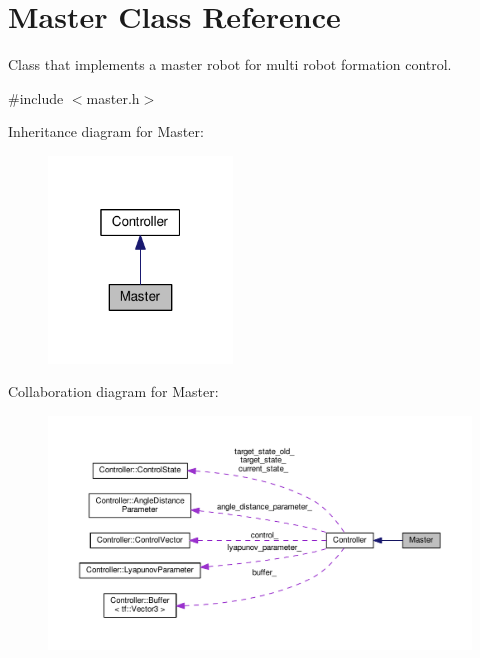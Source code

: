 \hypertarget{classMaster}{}\section{Master Class Reference}
\label{classMaster}


Class that implements a master robot for multi robot formation control.  




{\ttfamily \#include $<$master.\+h$>$}



Inheritance diagram for Master\+:\nopagebreak
\begin{figure}[H]
\begin{center}
\leavevmode
\includegraphics[width=139pt]{db/de8/classMaster__inherit__graph}
\end{center}
\end{figure}


Collaboration diagram for Master\+:\nopagebreak
\begin{figure}[H]
\begin{center}
\leavevmode
\includegraphics[width=350pt]{db/ddf/classMaster__coll__graph}
\end{center}
\end{figure}
